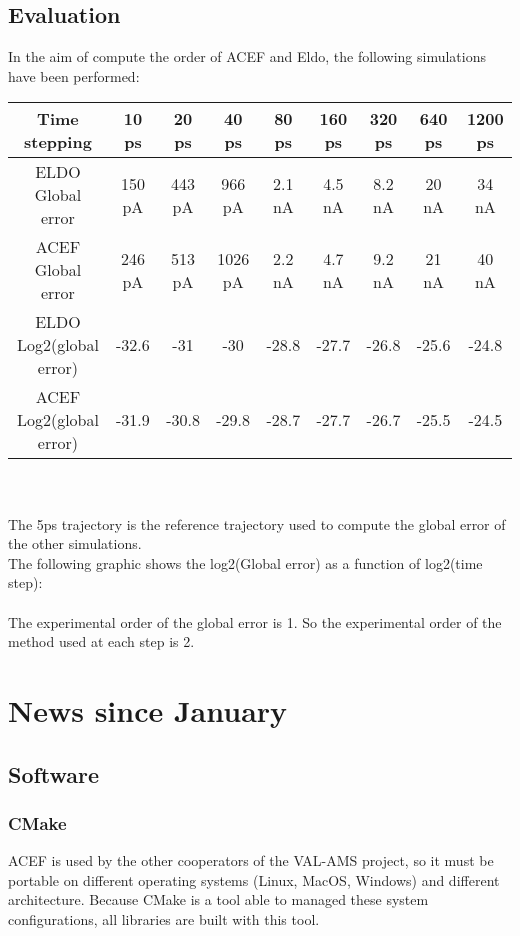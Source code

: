 \subsection{Evaluation}
In the aim of compute the order of ACEF and Eldo, the following simulations have been performed:\\
\begin{tabular}{|c|c|c|c|c|c|c|c|c|}
\hline
Time stepping & 10 ps & 20 ps & 40 ps & 80 ps & 160 ps & 320 ps & 640 ps & 1200 ps \\
\hline
ELDO Global error & 150 pA & 443 pA & 966 pA & 2.1 nA & 4.5 nA & 8.2 nA & 20 nA & 34 nA \\
\hline
ACEF Global error & 246 pA & 513 pA & 1026 pA & 2.2 nA & 4.7 nA & 9.2 nA & 21 nA & 40 nA \\
\hline
ELDO Log2(global error)& -32.6 & -31 & -30 & -28.8  & -27.7 & -26.8 & -25.6 & -24.8 \\
\hline
ACEF Log2(global error)& -31.9 & -30.8 & -29.8 & -28.7  & -27.7 & -26.7 & -25.5 & -24.5 \\
\hline
\end{tabular}\\
\\
The 5ps trajectory is the reference trajectory used to compute the global error of the other
simulations. \\The following graphic shows the log2(Global error) as a function of log2(time
step):\\
\\
The experimental order of the global error is 1. So the experimental order of the method used at
each step is 2.\\
\newpage
\section{News since January}

\subsection{Software}

\subsubsection{CMake}
ACEF is used by the other cooperators of the VAL-AMS project, so it must be portable on different operating systems (Linux, MacOS, Windows) and
different architecture. Because CMake is a tool able to managed these system configurations, all
libraries are built with this tool.


